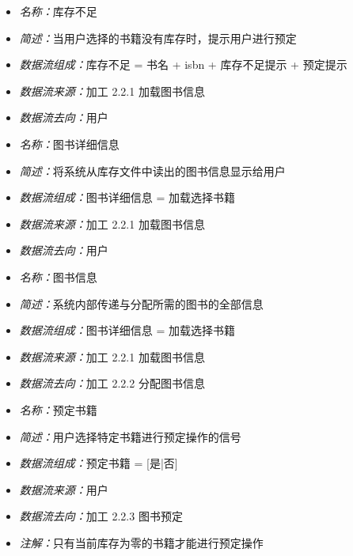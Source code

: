\vspace{-1mm}

\begin{itemize}
	\item \textit{名称：}库存不足
	\item \textit{简述：}当用户选择的书籍没有库存时，提示用户进行预定
	\item \textit{数据流组成：}库存不足 = 书名 + isbn + 库存不足提示 + 预定提示
	\item \textit{数据流来源：}加工 2.2.1 加载图书信息
	\item \textit{数据流去向：}用户
\end{itemize}

\vspace{-1mm}

\begin{itemize}
	\item \textit{名称：}图书详细信息
	\item \textit{简述：}将系统从库存文件中读出的图书信息显示给用户
	\item \textit{数据流组成：}图书详细信息 = 加载选择书籍
	\item \textit{数据流来源：}加工 2.2.1 加载图书信息
	\item \textit{数据流去向：}用户
\end{itemize}

\vspace{-1mm}

\begin{itemize}
	\item \textit{名称：}图书信息
	\item \textit{简述：}系统内部传递与分配所需的图书的全部信息
	\item \textit{数据流组成：}图书详细信息 = 加载选择书籍
	\item \textit{数据流来源：}加工 2.2.1 加载图书信息
	\item \textit{数据流去向：}加工 2.2.2 分配图书信息
\end{itemize}

\vspace{-1mm}

\begin{itemize}
	\item \textit{名称：}预定书籍
	\item \textit{简述：}用户选择特定书籍进行预定操作的信号
	\item \textit{数据流组成：}预定书籍 = [是|否]
	\item \textit{数据流来源：}用户
	\item \textit{数据流去向：}加工 2.2.3 图书预定
	\item \textit{注解：}只有当前库存为零的书籍才能进行预定操作
\end{itemize}

